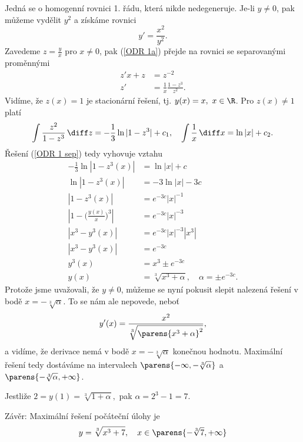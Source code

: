 \documentclass[answers]{exam}
\begin{document}
\begin{questions}
  \begin{solution}
		Jedn\'a se o homogenn\'i rovnici 1. \v r\'adu, kter\'a nikde nedegeneruje. Je-li $y\ne0$, pak m\r u\v zeme vyd\v elit $y^2$ a z\'isk\'ame rovnici
		\begin{equation}\label{ODR 1a}
		y'=\frac{x^2}{y^2}. 
		\end{equation}
		Zavedeme $z=\frac{y}{x}$ pro $x\ne0$, pak (\ref{ODR 1a}) p\v rejde na rovnici se separovan\'ymi prom\v enn\'ymi
		\begin{align}\label{ODR 1 sep}
		z'x+z&=z^{-2}\nonumber\\
		z'&=\frac{1}{x}\frac{1-z^3}{z^2}.
		\end{align}	
		Vid\'ime, \v ze $z(x)=1$ je stacion\'arn\'i \v re\v sen\'i, tj. $y(x)=x,\ x\in\R$. Pro $z(x)\ne1$ plat\'i
		\begin{align*}
		\int\frac{z^2}{1-z^3}\, \diff z=-\frac{1}{3}\ln|1-z^3|+c_1,\quad \int\frac{1}{x}\,\diff x=\ln|x|+c_2. 
		\end{align*}
		\v Re\v sen\'i (\ref{ODR 1 sep}) tedy vyhovuje vztahu
		\begin{align*}
		-\frac{1}{3}\ln|1-z^3(x)|&=\ln|x|+c\\ 
		\ln|1-z^3(x)|&=-3\ln|x|-3c\\ 
		|1-z^3(x)|&=e^{-3c}|x|^{-1}\\
		|1-\big(\frac{y(x)}{x}\big)^3|&=e^{-3c}|x|^{-3}\\
		|x^3-y^3(x)|&=e^{-3c}|x|^{-3}|x^3|\\
		|x^3-y^3(x)|&=e^{-3c}\\
		y^3(x)&=x^3\pm e^{-3c}\\
		y(x)&=\sqrt[3]{x^3+\alpha},\quad \alpha=\pm e^{-3c}.
		\end{align*}
		Protože jsme uvažovali, že $y \neq 0$, můžeme se nyní pokusit slepit nalezená řešení v bodě $x = - \sqrt[3]{\alpha}$. To se nám ale nepovede, neboť
		\begin{equation*}
			y'(x)
			=
			\frac{x^2}{\sqrt[3]{\parens{x^3 + \alpha}^2}},
		\end{equation*} 
		a vidíme, že derivace nemá v bodě $x = - \sqrt[3]{\alpha}$ konečnou hodnotu. Maximální řešení tedy dostáváme na intervalech $\parens{-\infty, -\sqrt[3]{\alpha}}$ a $\parens{-\sqrt[3]{\alpha}, +\infty}$.
		
		Jestli\v ze $2=y(1)=\sqrt[3]{1+\alpha},$ pak $\alpha=2^3-1=7.$
		
		Z\'av\v er: Maxim\'aln\'i \v re\v sen\'i počáteční úlohy je 
		\begin{equation*}\label{reseni 7}
		y=\sqrt[3]{x^3+7},\quad x\in \parens{-\sqrt[3]{7}, +\infty} 
		\end{equation*}
  \end{solution}
  

\end{questions}
\end{document}
